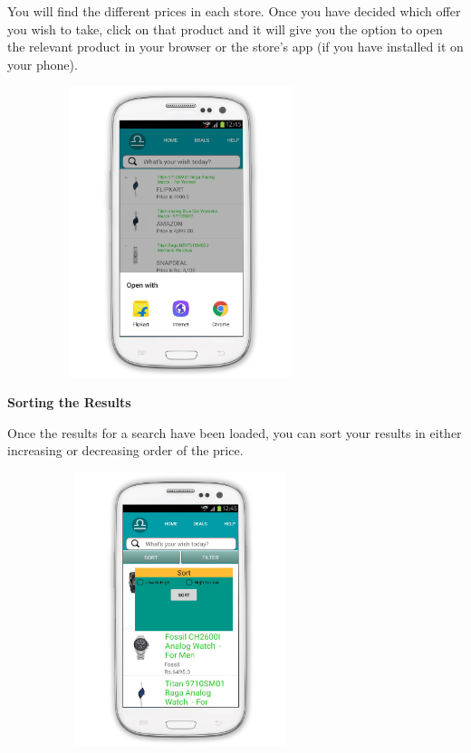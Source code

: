 \vspace{1mm}

You will find the different prices in each store. Once you have decided which offer you wish to take, click on that product and it will give you the option to open the relevant product in your browser or the store’s app (if you have installed it on your phone).

\begin{figure}[h!]
\centering
\includegraphics[width=8cm, height=8.5cm]{figure/redirect.png}
\end{figure}

\newpage

\textbf{\large Sorting the Results}\\
\vspace{2mm}

Once the results for a search have been loaded, you can sort your results in either increasing or decreasing order of the price. 

\begin{figure}[h!]
\centering
\includegraphics[width=8cm, height=8cm]{figure/sorting.png}
\end{figure}


